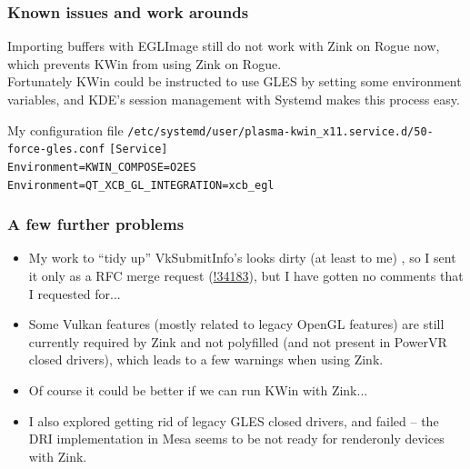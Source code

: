 \documentclass{beamer}
\begin{document}
\begin{frame}
	\frametitle{Known issues and work arounds}
	Importing buffers with EGLImage still do not work with Zink on Rogue now, which prevents KWin from using Zink on Rogue. \\
	Fortunately KWin could be instructed to use GLES by setting some environment variables, and KDE's session management with Systemd makes this process easy. \\
	\begin{block}{My configuration file \texttt{/etc/systemd/user/plasma-kwin\_x11.service.d/50-force-gles.conf}}
		\texttt{[Service] \\
			Environment=KWIN\_COMPOSE=O2ES \\
			Environment=QT\_XCB\_GL\_INTEGRATION=xcb\_egl
		}
	\end{block}
\end{frame}

\begin{frame}
	\frametitle{A few further problems}
	\begin{itemize}
		\item My work to ``tidy up'' VkSubmitInfo's looks dirty (at least to me) , so I sent it only as a RFC merge request (\href{https://gitlab.freedesktop.org/mesa/mesa/-/merge_requests/34183}{!34183}), but I have gotten no comments that I requested for...
		\item Some Vulkan features (mostly related to legacy OpenGL features) are still currently required by Zink and not polyfilled (and not present in PowerVR closed drivers), which leads to a few warnings when using Zink.
		\item Of course it could be better if we can run KWin with Zink...
		\item I also explored getting rid of legacy GLES closed drivers, and failed -- the DRI implementation in Mesa seems to be not ready for renderonly devices with Zink.
	\end{itemize}
\end{frame}
\end{document}
